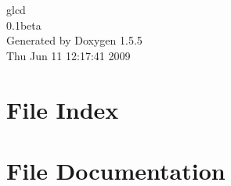 \documentclass[a4paper]{book}
\begin{document}
\begin{titlepage}
\vspace*{7cm}
\begin{center}
{\Large glcd \\[1ex]\large 0.1beta }\\
\vspace*{1cm}
{\large Generated by Doxygen 1.5.5}\\
\vspace*{0.5cm}
{\small Thu Jun 11 12:17:41 2009}\\
\end{center}
\end{titlepage}
\clearemptydoublepage
{}
\tableofcontents
\clearemptydoublepage
{}
\chapter{File Index}

\chapter{File Documentation}












\printindex
\end{document}
